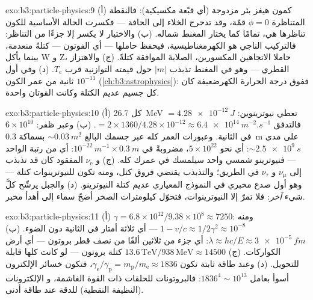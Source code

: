 \begin{solution}{exo:b3:particle-physics:9}
(أ) كمون هيغز بئر مزدوجة (أي قبّعة مكسيكية): فالنقطة
المتناظرة $\phi = 0$ قمّة، وقد تدحرج الخلاء
إلى الحافة --- فكسرت الحالة الأساسية للكون تناظرها
هي، تمامًا كما يختار المغنط شماله. (ب) والاختيار
لا يكسر إلا جزءًا من التناظر: فالتركيب الناجي
هو الكهرمغناطيسية، فيحفظ حاملها --- أي الفوتون ---
كتلةً منعدمة، بينما يأكل W و Z، حاملا الاتجاهين المكسورين،
الصلابةَ الموافقة كتلةً. (ج) والاهتزاز القطري
 --- وهو في المغنط تذبذب $|m|$ حول
قيمته التوازنية قرب
$T_{\text{c}}$. (د) وفي أول $10^{-11}$ ثانية من عمر
الكون (\cref{ch:b3:astrophysics}): ففوق درجة الحرارة
الكهرضعيفة كان كل جسيم عديم الكتلة وكانت القوتان
واحدة.
\end{solution}

\begin{solution}{exo:b3:particle-physics:10}
(أ) كل \qty{26.7}{MeV} $= \qty{4.28e-12}{J}$ تعطي
نيوترينوين: فالتدفق $= 2\times1360/4.28\times10^{-12} \approx
\qty{6.4e14}{m^{-2}.s^{-1}}$. (ب) وعبر ظفر:
$6\times10^{10}$ في الثانية. وعبورات العمر كله عبر جسمك
البالغ ${\sim}\qty{0.03}{m^2}$ بسماكة \qty{0.3}{m} على مدى
${\sim}\qty{2.5e9}{s}$: أي نحو $5\times10^{22}$، مضروبةً في
$10^{-22}\,\unit{m^{-1}}\times\qty{0.3}{m}$: أي من رتبة الواحد ---
فنيوترينو شمسي واحد سيلمسك في عمرك كله. (ج)
و $\nu_{\text{e}}$ المفقود كان قد تذبذب إلى $\nu_\mu$ و
$\nu_\tau$ في الطريق؛ والتذبذب يقتضي فروق كتل، ومنه
تكون للنيوترينوات كتلة --- وهو أول صدع مخبري في
النموذج المعياري عديم كتلة النيوترينو. (د) والجبل يرشّح
كلَّ شيء \emph{آخر}: فلا تمرّ إلا النيوترينوات، فتحوّل كيلومترات
الصخر أضجّ سماء إلى أهدأ مخبر.
\end{solution}

\begin{solution}{exo:b3:particle-physics:11}
(أ) $\gamma = 6.8\times10^{12}/9.38\times10^{8} \approx 7250$:
ومنه $1 - v/c \approx 1/2\gamma^2 \approx 10^{-8}$ --- أي ثلاثة أمتار
في الثانية دون الضوء. (ب) $\lambda \approx hc/E \approx
\qty{3e-5}{fm}$: أي جزء من ثلاثين ألفًا من نصف قطر بروتون --- أي أرض
الكواركات. (ج) $13.6\,\text{TeV}/938\,\text{MeV} \approx
14500$ كتلة بروتون --- لو كانت كلها قابلة للتحويل. (د) وعند
طاقة ثابتة تكون $\gamma_{\text{e}}/\gamma_{\text{p}} =
m_{\text{p}}/m_{\text{e}} \approx 1836$، فتكون خسائر الإلكترون
أسوأ بعامل $1836^4 \sim 10^{13}$: فالبروتونات للحلقات ذات القوة الغاشمة، و
الإلكترونات (النظيفة النقطية) للدقة عند طاقة أدنى.
\end{solution}

